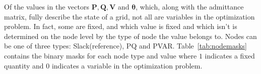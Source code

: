 Of the values in the vectors $\boldsymbol{P}, \boldsymbol{Q}, \boldsymbol{V}$ and $\boldsymbol{\theta}$,
which, along with the admittance matrix, fully describe the state of a grid, not all are variables in the optimization problem.
In fact, some are fixed, and which value is fixed and which isn't is determined on the node level by the type of node the value belongs to.
Nodes can be one of three types: Slack(reference), PQ and PVAR.
Table~\ref{tab:nodemasks} contains the binary masks for each node type and value where $1$ indicates a fixed quantity and $0$
indicates a variable in the optimization problem.